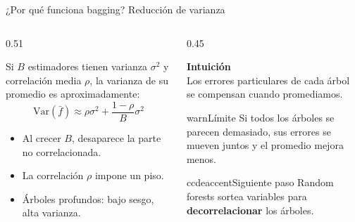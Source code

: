 \documentclass[aspectratio=169,11pt,table]{beamer}
\begin{document}
\begin{frame}{¿Por qué funciona bagging? Reducción de varianza}
\footnotesize
\begin{columns}[T,onlytextwidth]
\begin{column}{0.51\textwidth}
\begin{ccdebox}
\footnotesize
Si \(B\) estimadores tienen varianza \(\sigma^2\) y correlación media \(\rho\), la varianza de su promedio es aproximadamente:
\[
\mathrm{Var}(\bar f)\approx
\rho\sigma^2+\frac{1-\rho}{B}\sigma^2
\]
\begin{itemize}
  \item Al crecer \(B\), desaparece la parte no correlacionada.
  \item La correlación \(\rho\) impone un piso.
  \item Árboles profundos: bajo sesgo, alta varianza.
\end{itemize}
\end{ccdebox}
\end{column}
\begin{column}{0.45\textwidth}
\begin{keybox}[fontupper=\footnotesize]
\textbf{Intuición}\\[0.12cm]
Los errores particulares de cada árbol se compensan cuando promediamos.
\end{keybox}
\vspace{0.10cm}
\begin{contrastbox}{warn}{Límite}
\footnotesize
Si todos los árboles se parecen demasiado, sus errores se mueven juntos y el promedio mejora menos.
\end{contrastbox}
\vspace{0.10cm}
\begin{contrastbox}{ccdeaccent}{Siguiente paso}
\footnotesize
Random forests sortea variables para \textbf{decorrelacionar} los árboles.
\end{contrastbox}
\end{column}
\end{columns}
\end{frame}
\end{document}
